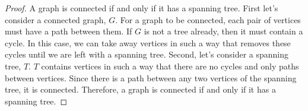 \documentclass[12pt,letterpaper]{exam}
\begin{document}
\begin{questions}
\begin{proof}

A graph is connected if and only if it has a spanning tree. First let's consider a connected graph, $G$. For a graph to be connected, each pair of vertices must have a path between them. If $G$ is not a tree already, then it must contain a cycle. In this case, we can take away vertices in such a way that removes these cycles until we are left with a spanning tree. Second, let's consider a spanning tree, $T$. $T$ contains vertices in such a way that there are no cycles and only paths between vertices. Since there is a path between any two vertices of the spanning tree, it is connected. Therefore, a graph is connected if and only if it has a spanning tree.

\end{proof}



\end{questions}
\end{document}
